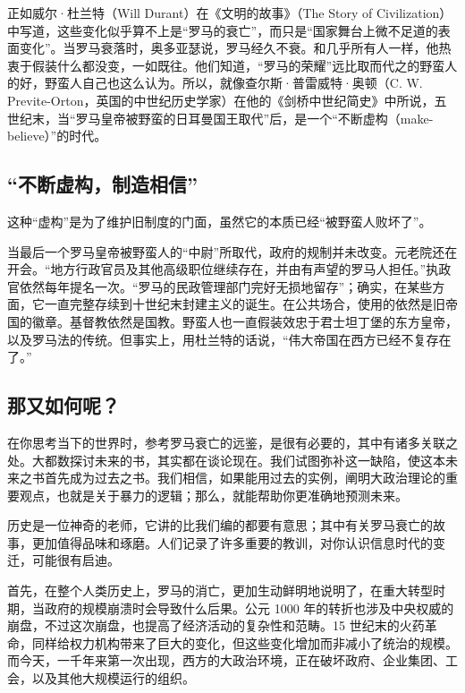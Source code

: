 正如威尔·杜兰特（Will Durant）在《文明的故事》（The Story of Civilization）中写道，这些变化似乎算不上是“罗马的衰亡”，而只是“国家舞台上微不足道的表面变化”。当罗马衰落时，奥多亚瑟说，罗马经久不衰。和几乎所有人一样，他热衷于假装什么都没变，一如既往。他们知道，“罗马的荣耀”远比取而代之的野蛮人的好，野蛮人自己也这么认为。所以，就像查尔斯·普雷威特·奥顿（C. W. Previte-Orton，英国的中世纪历史学家）在他的《剑桥中世纪简史》中所说，五世纪末，当“罗马皇帝被野蛮的日耳曼国王取代”后，是一个“不断虚构（make-believe）”的时代。

\subsection{“不断虚构，制造相信”}
这种“虚构”是为了维护旧制度的门面，虽然它的本质已经“被野蛮人败坏了”。

当最后一个罗马皇帝被野蛮人的“中尉”所取代，政府的规制并未改变。元老院还在开会。“地方行政官员及其他高级职位继续存在，并由有声望的罗马人担任。”执政官依然每年提名一次。“罗马的民政管理部门完好无损地留存”；确实，在某些方面，它一直完整存续到十世纪末封建主义的诞生。在公共场合，使用的依然是旧帝国的徽章。基督教依然是国教。野蛮人也一直假装效忠于君士坦丁堡的东方皇帝，以及罗马法的传统。但事实上，用杜兰特的话说，“伟大帝国在西方已经不复存在了。”

\subsection{那又如何呢？}
在你思考当下的世界时，参考罗马衰亡的远鉴，是很有必要的，其中有诸多关联之处。大都数探讨未来的书，其实都在谈论现在。我们试图弥补这一缺陷，使这本未来之书首先成为过去之书。我们相信，如果能用过去的实例，阐明大政治理论的重要观点，也就是关于暴力的逻辑；那么，就能帮助你更准确地预测未来。

历史是一位神奇的老师，它讲的比我们编的都要有意思；其中有关罗马衰亡的故事，更加值得品味和琢磨。人们记录了许多重要的教训，对你认识信息时代的变迁，可能很有启迪。

首先，在整个人类历史上，罗马的消亡，更加生动鲜明地说明了，在重大转型时期，当政府的规模崩溃时会导致什么后果。公元 1000 年的转折也涉及中央权威的崩盘，不过这次崩盘，也提高了经济活动的复杂性和范畴。15 世纪末的火药革命，同样给权力机构带来了巨大的变化，但这些变化增加而非减小了统治的规模。而今天，一千年来第一次出现，西方的大政治环境，正在破坏政府、企业集团、工会，以及其他大规模运行的组织。

